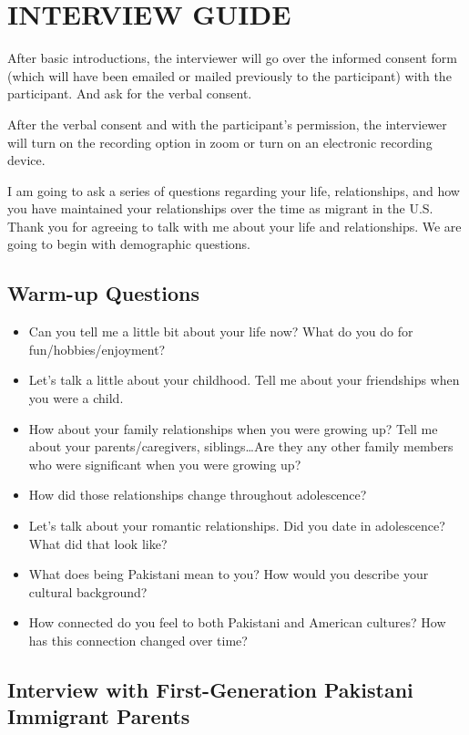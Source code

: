 \chapter{\texorpdfstring{INTERVIEW GUIDE}{}}

After basic introductions, the interviewer will go over the informed consent form (which will have been emailed or mailed previously to the participant) with the participant. And ask for the verbal consent.
 
After the verbal consent and with the participant’s permission, the interviewer will turn on the recording option in zoom or turn on an electronic recording device.
 
I am going to ask a series of questions regarding your life, relationships, and how you have maintained your relationships over the time as migrant in the U.S. Thank you for agreeing to talk with me about your life and relationships. We are going to begin with demographic questions.

\section{Warm-up Questions}

\begin{itemize}
    \item Can you tell me a little bit about your life now? What do you do for fun/hobbies/enjoyment? 
    \item Let’s talk a little about your childhood. Tell me about your friendships when you were a child. 
    \item How about your family relationships when you were growing up? Tell me about your parents/caregivers, siblings…Are they any other family members who were significant when you were growing up? 
    \item How did those relationships change throughout adolescence? 
    \item Let’s talk about your romantic relationships. Did you date in adolescence? What did that look like? 
    \item What does being Pakistani mean to you? How would you describe your cultural background?
    \item How connected do you feel to both Pakistani and American cultures? How has this connection changed over time?
\end{itemize}

\section{Interview with First-Generation Pakistani Immigrant Parents}

